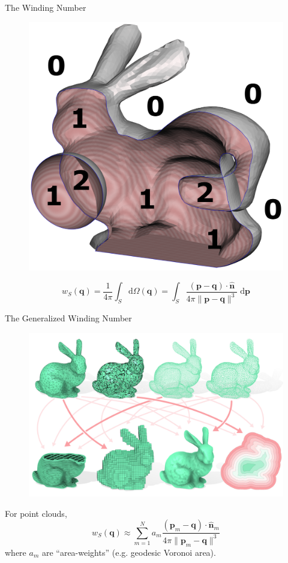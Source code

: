 \documentclass[10pt]{beamer}
\newcommand{\bp}{\mathbf{p}}
\newcommand{\bq}{\mathbf{q}}
\newcommand{\bn}{\mathbf{n}}
\begin{document}
 {
  \begin{frame}{The Winding Number}
      \begin{figure}
          \centering
          \includegraphics[width=0.4\linewidth]{figures/wn/wn.png}
      \end{figure}

      \begin{equation*}
          w_S(\bq) = \frac{1}{4\pi} \int_{S} \mathrm{d}\Omega(\bq) = \int_{S} \frac{(\bp - \bq) \cdot \widehat{\bn}}{4\pi \|\bp - \bq\|^3} \; \mathrm{d}\bp
      \end{equation*}
  \end{frame}
 }

 {
  \begin{frame}{The \alert{Generalized} Winding Number}
      \begin{figure}
          \centering
          \includegraphics[width=0.6\linewidth]{figures/wn/gwn.png}
      \end{figure}

      For point clouds,
      \begin{equation*}
          w_S(\bq) \approx \sum_{m=1}^{N} a_m \frac{(\bp_m - \bq)\cdot \widehat{\bn}_m}{4\pi\|\bp_m - \bq\|^3}
      \end{equation*}
      where \(a_m\) are ``area-weights'' (e.g. geodesic Voronoi area).
  \end{frame}
 }
\end{document}
